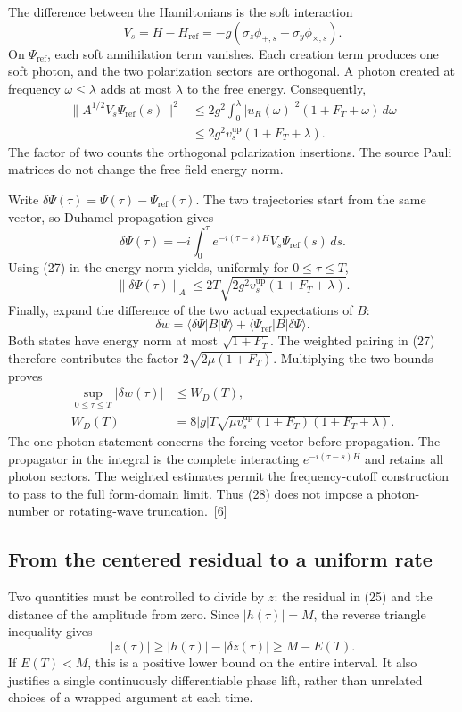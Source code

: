 \documentclass[10pt,twocolumn,letterpaper]{article}
\begin{document}
The difference between the Hamiltonians is the soft interaction
\[
V_s=H-H_{\mathrm{ref}}
=-g(\sigma_z\phi_{+,s}+\sigma_y\phi_{\times,s}).
\]
On $\Psi_{\mathrm{ref}}$, each soft annihilation term vanishes. Each creation term produces one soft photon, and the two polarization sectors are orthogonal. A photon created at frequency $\omega\le\lambda$ adds at most $\lambda$ to the free energy. Consequently,
\[
\begin{aligned}
\|A^{1/2}V_s\Psi_{\mathrm{ref}}(s)\|^2
&\le2g^2\int_0^\lambda |u_R(\omega)|^2
        (1+F_T+\omega)\,d\omega\\
&\le2g^2v_s^{\mathrm{up}}(1+F_T+\lambda).
\end{aligned}
\]
The factor of two counts the orthogonal polarization insertions. The source Pauli matrices do not change the free field energy norm.

Write $\delta\Psi(\tau)=\Psi(\tau)-\Psi_{\mathrm{ref}}(\tau)$. The two trajectories start from the same vector, so Duhamel propagation gives
\[
\delta\Psi(\tau)
=-i\int_0^\tau e^{-i(\tau-s)H}
               V_s\Psi_{\mathrm{ref}}(s)\,ds.
\]
Using (27) in the energy norm yields, uniformly for $0\le\tau\le T$,
\[
\|\delta\Psi(\tau)\|_A
\le2T\sqrt{2g^2v_s^{\mathrm{up}}(1+F_T+\lambda)}.
\]
Finally, expand the difference of the two actual expectations of $B$:
\[
\delta w
=\langle\delta\Psi|B|\Psi\rangle
 +\langle\Psi_{\mathrm{ref}}|B|\delta\Psi\rangle.
\]
Both states have energy norm at most $\sqrt{1+F_T}$. The weighted pairing in (27) therefore contributes the factor $2\sqrt{2\mu(1+F_T)}$. Multiplying the two bounds proves
\begin{equation}
\begin{aligned}
\sup_{0\le\tau\le T}|\delta w(\tau)|&\le W_D(T),\\
W_D(T)&=8|g|T\sqrt{\mu v_s^{\mathrm{up}}(1+F_T)(1+F_T+\lambda)}.
\end{aligned}\tag{28}\label{eq:clock-duhamel}
\end{equation}
The one-photon statement concerns the forcing vector before propagation. The propagator in the integral is the complete interacting $e^{-i(\tau-s)H}$ and retains all photon sectors. The weighted estimates permit the frequency-cutoff construction to pass to the full form-domain limit. Thus (28) does not impose a photon-number or rotating-wave truncation.~[6]

\subsection{From the centered residual to a uniform rate}
Two quantities must be controlled to divide by $z$: the residual in (25) and the distance of the amplitude from zero. Since $|h(\tau)|=M$, the reverse triangle inequality gives
\[
|z(\tau)|\ge |h(\tau)|-|\delta z(\tau)|
\ge M-E(T).
\]
If $E(T)<M$, this is a positive lower bound on the entire interval. It also justifies a single continuously differentiable phase lift, rather than unrelated choices of a wrapped argument at each time.
\end{document}
